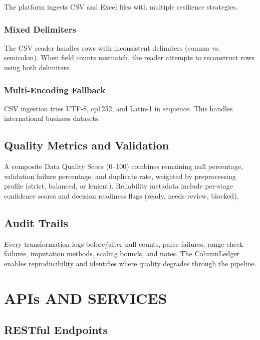 The platform ingests CSV and Excel files with multiple resilience strategies.

\subsection{Mixed Delimiters}

The CSV reader handles rows with inconsistent delimiters (comma vs. semicolon). When field counts mismatch, the reader attempts to reconstruct rows using both delimiters.

\subsection{Multi-Encoding Fallback}

CSV ingestion tries UTF-8, cp1252, and Latin-1 in sequence. This handles international business datasets.

\section{Quality Metrics and Validation}

A composite Data Quality Score (0--100) combines remaining null percentage, validation failure percentage, and duplicate rate, weighted by preprocessing profile (strict, balanced, or lenient). Reliability metadata include per-stage confidence scores and decision readiness flags (ready, needs-review, blocked).

\section{Audit Trails}

Every transformation logs before/after null counts, parse failures, range-check failures, imputation methods, scaling bounds, and notes. The ColumnLedger enables reproducibility and identifies where quality degrades through the pipeline.

\chapter{APIs AND SERVICES}
\label{ch:apis}

\section{RESTful Endpoints}

